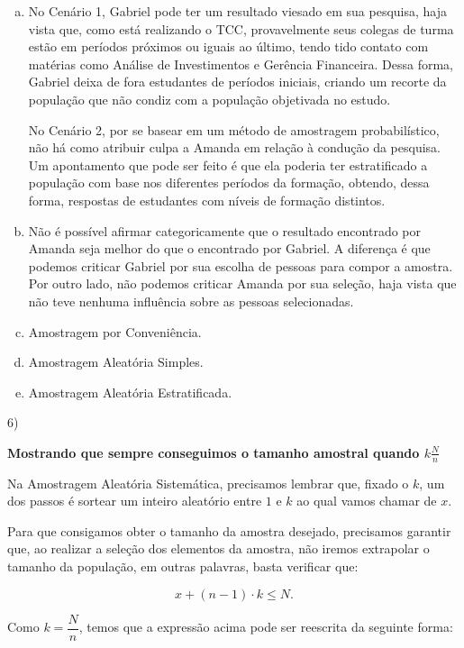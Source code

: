 \documentclass[12pt]{article}
\begin{document}
\begin{enumerate}[a)]
    \item No Cenário 1, Gabriel pode ter um resultado viesado em sua pesquisa, haja vista que, como está realizando o TCC, provavelmente seus colegas de turma estão 
    em períodos próximos ou iguais ao último, tendo tido contato com matérias como Análise de Investimentos e Gerência Financeira. Dessa forma, Gabriel deixa de fora
    estudantes de períodos iniciais, criando um recorte da população que não condiz com a população objetivada no estudo. 
    
    No Cenário 2, por se basear em um método de amostragem probabilístico, não há como atribuir culpa a Amanda em relação à condução da pesquisa. Um apontamento
    que pode ser feito é que ela poderia ter estratificado a população com base nos diferentes períodos da formação, obtendo, dessa forma, respostas de estudantes 
    com níveis de formação distintos.  

    \item Não é possível afirmar categoricamente que o resultado encontrado por Amanda seja melhor do que o encontrado por Gabriel. A diferença é que podemos criticar
    Gabriel por sua escolha de pessoas para compor a amostra. Por outro lado, não podemos criticar Amanda por sua seleção, haja vista que não teve nenhuma influência sobre 
    as pessoas selecionadas. 
    \item Amostragem por Conveniência.
    \item Amostragem Aleatória Simples.
    \item Amostragem Aleatória Estratificada. 
\end{enumerate}

6) 

 \textbf{Mostrando que sempre conseguimos o tamanho amostral quando $k\frac{N}{n}$}

\vspace{3px}

 Na Amostragem Aleatória Sistemática, precisamos lembrar que, fixado o $k$,  um dos passos é sortear um inteiro aleatório entre $1$ e $k$ ao qual vamos chamar de $x$. 

 Para que consigamos obter o tamanho da amostra desejado, precisamos garantir que, ao realizar a seleção dos elementos da amostra, não iremos extrapolar o tamanho da população, 
 em outras palavras, basta verificar que:

 $$x + (n-1) \cdot k \leq N.$$

 Como  $k = \dfrac{N}{n}$, temos que a expressão acima pode ser reescrita da seguinte forma:
\end{document}
